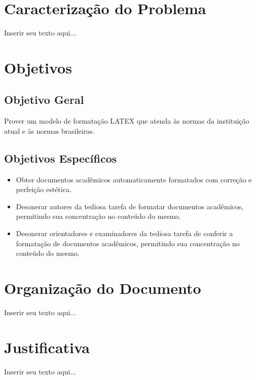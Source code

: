 \section{Caracterização do Problema}
\label{sec:caracProblema}

Inserir seu texto aqui...

\section{Objetivos}
\label{sec:objetivos}

\subsection{Objetivo Geral}
\label{subsec:objetivoGeral}

Prover um modelo de formatação LATEX que atenda às normas da instituição atual e às normas brasileiras.

\subsection{Objetivos Específicos}
\label{subsec:objetivosEspecificos}

\begin{itemize}
	\item Obter documentos acadêmicos automaticamente formatados com correção e perfeição estética.
	\item Desonerar autores da tediosa tarefa de formatar documentos acadêmicos, permitindo sua concentração no conteúdo do mesmo.
	\item Desonerar orientadores e examinadores da tediosa tarefa de conferir a formatação de documentos acadêmicos, permitindo sua concentração no conteúdo do mesmo.
\end{itemize}


\section{Organização do Documento}
\label{sec:organizacaoDocumento}

Inserir seu texto aqui...

\section{Justificativa}
\label{sec:justificativa}

Inserir seu texto aqui...
